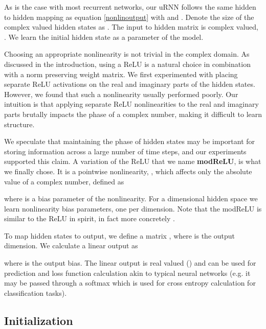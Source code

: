 \documentclass{article}
\begin{document}
As is the case with most recurrent networks, our uRNN follows the same hidden to hidden mapping as 
equation \ref{nonlinoutput} with  and . 
Denote the size of the complex valued hidden states as .
The input to hidden matrix is complex valued, . 
We learn the initial hidden state  as a parameter of the model.

Choosing an appropriate nonlinearity is not trivial in the complex domain.
As discussed in the introduction, using a ReLU is a natural choice in combination with a norm preserving
weight matrix. We first experimented with placing separate ReLU activations on the real and imaginary
parts of the hidden states.
However, we found that such a nonlinearity usually performed poorly.
Our intuition is that applying separate ReLU nonlinearities to the real 
and imaginary parts brutally impacts the 
phase of a complex number, making it difficult to learn structure.

We speculate that maintaining the phase of hidden states may be important for storing information 
across a large number of time steps, and our experiments supported this claim.
A variation of the ReLU that we name {\bf modReLU}, is what we 
finally chose. It is a pointwise nonlinearity,  
, which
affects only the absolute value of a complex number, defined as 


where  is a bias parameter of the nonlinearity. For a  dimensional hidden space
we learn  nonlinearity bias parameters, one per dimension. 
Note that the modReLU is similar to the ReLU in spirit, in fact more concretely
. 

To map hidden states to output, we define a matrix , 
where  is the output dimension. We calculate a linear output as
\vspace{-0.5mm}

\vspace{-0.25mm}
where  is the output bias. 
The linear output is real valued () and can be used for prediction and loss function 
calculation akin to typical neural networks (e.g. it may be passed through a softmax which is used for 
cross entropy calculation for classification tasks).

\vspace{-1mm}
\subsection{Initialization}
\end{document}
